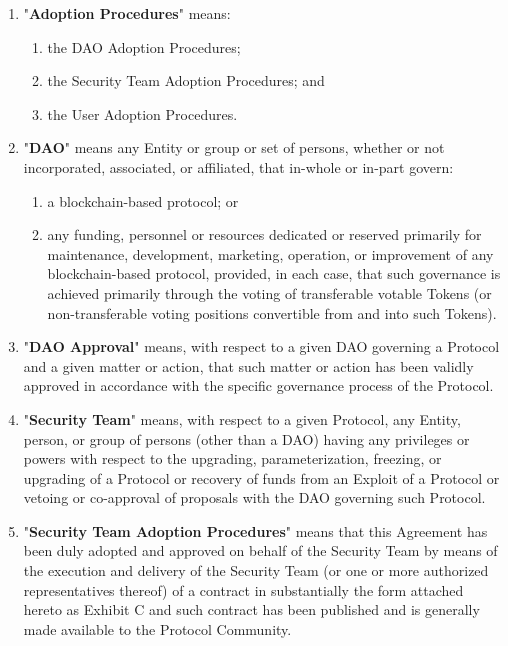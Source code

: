\documentclass{article}
\begin{document}
\begin{enumerate}[label=\Alph*.]
    \item "\textbf{Adoption Procedures}" means:
          \begin{enumerate}
              \item the DAO Adoption Procedures;
              \item the Security Team Adoption Procedures; and
              \item the User Adoption Procedures.
          \end{enumerate}

    \item "\textbf{DAO}" means any Entity or group or set of persons, whether or not incorporated, associated, or affiliated, that in-whole or in-part govern:

          \begin{enumerate}
              \item a blockchain-based protocol; or
              \item any funding, personnel or resources dedicated or reserved primarily for maintenance, development, marketing, operation, or improvement of any blockchain-based protocol, provided, in each case, that such governance is achieved primarily through the voting of transferable votable Tokens (or non-transferable voting positions convertible from and into such Tokens).
          \end{enumerate}

    \item "\textbf{DAO Approval}" means, with respect to a given DAO governing a Protocol and a given matter or action, that such matter or action has been validly approved in accordance with the specific governance process of the Protocol.

    \item "\textbf{Security Team}" means, with respect to a given Protocol, any Entity, person, or group of persons (other than a DAO) having any privileges or powers with respect to the upgrading, parameterization, freezing, or upgrading of a Protocol or recovery of funds from an Exploit of a Protocol or vetoing or co-approval of proposals with the DAO governing such Protocol.

    \item "\textbf{Security Team Adoption Procedures}" means that this Agreement has been duly adopted and approved on behalf of the Security Team by means of the execution and delivery of the Security Team (or one or more authorized representatives thereof) of a contract in substantially the form attached hereto as Exhibit C and such contract has been published and is generally made available to the Protocol Community.


\end{enumerate}
\end{document}

